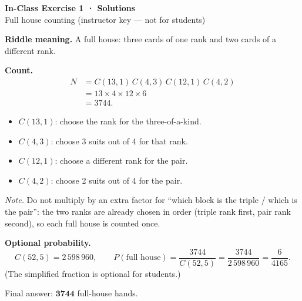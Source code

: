 \documentclass[11pt,a4paper,UTF8]{ctexart}
\begin{document}
\begin{center}
  {\Large\bfseries\color{night} In-Class Exercise 1 · Solutions}\\[0.3em]
  {\normalsize Full house counting (instructor key --- not for students)}
\end{center}

\vspace{0.6em}

\noindent\textbf{Riddle meaning.}
A full house: three cards of one rank and two cards of a different rank.

\vspace{0.5em}

\noindent\textbf{Count.}
\[
\begin{aligned}
N
&= C(13,1)\,C(4,3)\,C(12,1)\,C(4,2) \\
&= 13 \times 4 \times 12 \times 6 \\
&= 3744.
\end{aligned}
\]

\begin{itemize}[leftmargin=1.4em]
  \item $C(13,1)$: choose the rank for the three-of-a-kind.
  \item $C(4,3)$: choose 3 suits out of 4 for that rank.
  \item $C(12,1)$: choose a different rank for the pair.
  \item $C(4,2)$: choose 2 suits out of 4 for the pair.
\end{itemize}

\noindent\textit{Note.}
Do not multiply by an extra factor for ``which block is the triple / which is the pair'':
the two ranks are already chosen in order (triple rank first, pair rank second), so each full house is counted once.

\vspace{0.55em}

\noindent\textbf{Optional probability.}
\[
C(52,5)=2\,598\,960,
\qquad
P(\text{full house})=\frac{3744}{C(52,5)}=\frac{3744}{2\,598\,960}=\frac{6}{4165}.
\]
(The simplified fraction is optional for students.)

\vspace{0.7em}
\begin{tcolorbox}[colback=lantern!5,colframe=lantern,title=\textbf{Quick check}]
Final answer: $\mathbf{3744}$ full-house hands.
\end{tcolorbox}
\end{document}
